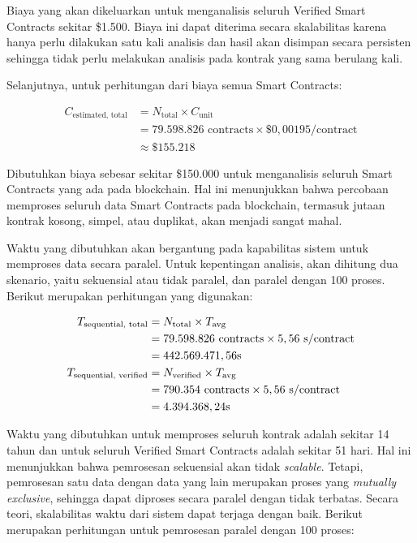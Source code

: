 Biaya yang akan dikeluarkan untuk menganalisis seluruh Verified Smart Contracts sekitar \$1.500. Biaya ini dapat diterima secara skalabilitas karena hanya perlu dilakukan satu kali analisis dan hasil akan disimpan secara persisten sehingga tidak perlu melakukan analisis pada kontrak yang sama berulang kali.

Selanjutnya, untuk perhitungan dari biaya semua Smart Contracts:

\begin{align*}
	C_{\text{estimated, total}} &= N_{\text{total}} \times C_{\text{unit}} \\
	&= 79.598.826 \text{ contracts} \times \$0,00195/\text{contract} \\
	&\approx \$155.218
\end{align*}

Dibutuhkan biaya sebesar sekitar \$150.000 untuk menganalisis seluruh Smart Contracts yang ada pada blockchain. Hal ini menunjukkan bahwa percobaan memproses seluruh data Smart Contracts pada blockchain, termasuk jutaan kontrak kosong, simpel, atau duplikat, akan menjadi sangat mahal.


Waktu yang dibutuhkan akan bergantung pada kapabilitas sistem untuk memproses data secara paralel. Untuk kepentingan analisis, akan dihitung dua skenario, yaitu sekuensial atau tidak paralel, dan paralel dengan 100 proses. Berikut merupakan perhitungan yang digunakan:

\begin{align*}
	T_{\text{sequential, total}} &= N_{\text{total}} \times T_{\text{avg}} \\
	&= 79.598.826 \text{ contracts} \times 5,56 \text{ \text{s}/\text{contract}} \\
	&= 442.569.471,56 \text{s} \\
	T_{\text{sequential, verified}} &= N_{\text{verified}} \times T_{\text{avg}} \\
	&= 790.354 \text{ contracts} \times 5,56 \text{ \text{s}/\text{contract}} \\
	&= 4.394.368,24 \text{s}
\end{align*}

Waktu yang dibutuhkan untuk memproses seluruh kontrak adalah sekitar 14 tahun dan untuk seluruh Verified Smart Contracts adalah sekitar 51 hari. Hal ini menunjukkan bahwa pemrosesan sekuensial akan tidak \textit{scalable}. Tetapi, pemrosesan satu data dengan data yang lain merupakan proses yang \textit{mutually exclusive}, sehingga dapat diproses secara paralel dengan tidak terbatas. Secara teori, skalabilitas waktu dari sistem dapat terjaga dengan baik. Berikut merupakan perhitungan untuk pemrosesan paralel dengan 100 proses:

